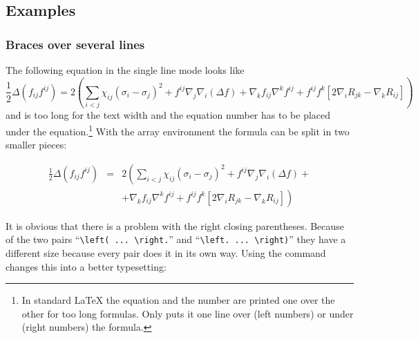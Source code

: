 \clearpage


\subsection{Examples}
\subsubsection{Braces over several lines}\label{cap:Use-of-the-vphantom}
The following equation in the single line mode looks like
%
\begin{equation}
\frac{1}{2}\Delta(f_{ij}f^{ij})=2\left(\sum_{i<j}\chi_{ij}
    (\sigma_{i}-\sigma_{j})^{2}+f^{ij}\nabla_{j}\nabla_{i}(\Delta f)
    +\nabla_{k}f_{ij}\nabla^{k}f^{ij}+f^{ij}f^{k}[2\nabla_{i}R_{jk}
    -\nabla_{k}R_{ij}]\right)\label{eq:braces}
\end{equation}
%
and is too long for the text width and the equation number has to be placed
under the equation.\footnote{In standard \LaTeX{} the equation and the number are
printed one over the other for too long
formulas. Only \AmSmath puts it one line over (left numbers) or under (right
numbers) the formula.} With the array environment the formula can be split in two smaller
pieces:

{\arraycolsep=2pt
\begin{equation}
\begin{array}{rcl}
	\frac{1}{2}\Delta(f_{ij}f^{ij}) & = & 2\left({\displaystyle
	\sum_{i<j}}\chi_{ij}(\sigma_{i}-\sigma_{j})^{2}+f^{ij}%
	\nabla_{j}\nabla_{i}(\Delta f)+\right.\\
&	& \left.+\nabla_{k}f_{ij}\nabla^{k}f^{ij}+f^{ij}f^{k}[2
	\nabla_{i}R_{jk}-\nabla_{k}R_{ij}]\right)
\end{array}
\end{equation}
}


It is obvious that there is a problem with the right closing parentheses.
Because of the two pairs ``\verb|\left( ... \right.|''
and ``\verb|\left. ... \right)|''
they have a different size because every pair does it in its own
way. Using the  command changes this into a better
typesetting:

